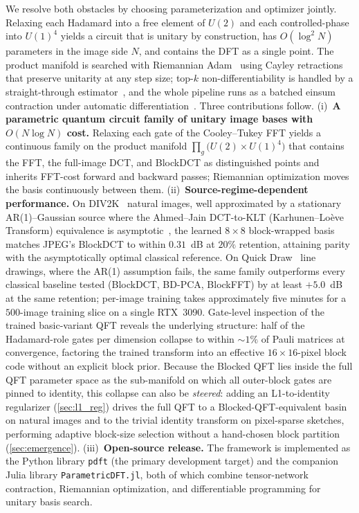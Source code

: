 \documentclass[a4paper, twocolumn]{quantumarticle}
\begin{document}
We resolve both obstacles by choosing parameterization and optimizer jointly.
Relaxing each Hadamard into a free element of $U(2)$ and each controlled-phase into $U(1)^4$ yields a circuit that is unitary by construction, has $O(\log^2 N)$ parameters in the image side $N$, and contains the DFT as a single point.
The product manifold is searched with Riemannian Adam~\cite{kingma2015adam, becigneul2019riemannian} using Cayley retractions~\cite{wen2013feasible, li2020efficient} that preserve unitarity at any step size; top-$k$ non-differentiability is handled by a straight-through estimator~\cite{bengio2013estimating}, and the whole pipeline runs as a batched einsum contraction under automatic differentiation~\cite{innes2018dont, OMEinsum, luo2020yao, liao2019differentiable}.
Three contributions follow.
(i)~\textbf{A parametric quantum circuit family of unitary image bases with $O(N \log N)$ cost.} Relaxing each gate of the Cooley--Tukey FFT yields a continuous family on the product manifold $\prod_g \bigl(U(2) \times U(1)^4\bigr)$ that contains the FFT, the full-image DCT, and BlockDCT as distinguished points and inherits FFT-cost forward and backward passes; Riemannian optimization moves the basis continuously between them.
(ii)~\textbf{Source-regime-dependent performance.} On DIV2K~\cite{div2k} natural images, well approximated by a stationary AR(1)--Gaussian source where the Ahmed--Jain DCT-to-KLT (Karhunen--Lo\`{e}ve Transform) equivalence is asymptotic~\cite{ahmed1974dct, jain1979sinusoidal}, the learned $8 \times 8$ block-wrapped basis matches JPEG's BlockDCT to within $0.31$~dB at $20\%$ retention, attaining parity with the asymptotically optimal classical reference. On Quick Draw~\cite{quickdraw} line drawings, where the AR(1) assumption fails, the same family outperforms every classical baseline tested (BlockDCT, BD-PCA, BlockFFT) by at least $+5.0$~dB at the same retention; per-image training takes approximately five minutes for a $500$-image training slice on a single RTX~3090. Gate-level inspection of the trained basic-variant QFT reveals the underlying structure: half of the Hadamard-role gates per dimension collapse to within $\sim\!1\%$ of Pauli matrices at convergence, factoring the trained transform into an effective $16 \times 16$-pixel block code without an explicit block prior. Because the Blocked QFT lies inside the full QFT parameter space as the sub-manifold on which all outer-block gates are pinned to identity, this collapse can also be \emph{steered}: adding an L1-to-identity regularizer (\cref{sec:l1_reg}) drives the full QFT to a Blocked-QFT-equivalent basin on natural images and to the trivial identity transform on pixel-sparse sketches, performing adaptive block-size selection without a hand-chosen block partition (\cref{sec:emergence}).
(iii)~\textbf{Open-source release.} The framework is implemented as the Python library \texttt{pdft} (the primary development target) and the companion Julia library \texttt{ParametricDFT.jl}, both of which combine tensor-network contraction, Riemannian optimization, and differentiable programming for unitary basis search.
\end{document}
